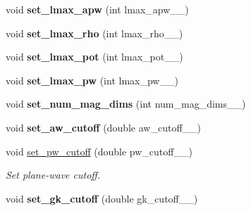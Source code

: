\begin{DoxyCompactItemize}
\item 
\hypertarget{classsirius_1_1_simulation__parameters_a7b558cb276a9d7a548591074cbcd6f9e}{}void {\bfseries set\+\_\+lmax\+\_\+apw} (int lmax\+\_\+apw\+\_\+\+\_\+)\label{classsirius_1_1_simulation__parameters_a7b558cb276a9d7a548591074cbcd6f9e}

\item 
\hypertarget{classsirius_1_1_simulation__parameters_ab98a7c7999850d742ddc232eb7f68f0a}{}void {\bfseries set\+\_\+lmax\+\_\+rho} (int lmax\+\_\+rho\+\_\+\+\_\+)\label{classsirius_1_1_simulation__parameters_ab98a7c7999850d742ddc232eb7f68f0a}

\item 
\hypertarget{classsirius_1_1_simulation__parameters_a60e8583373da5dbcac50e55300fe0f39}{}void {\bfseries set\+\_\+lmax\+\_\+pot} (int lmax\+\_\+pot\+\_\+\+\_\+)\label{classsirius_1_1_simulation__parameters_a60e8583373da5dbcac50e55300fe0f39}

\item 
\hypertarget{classsirius_1_1_simulation__parameters_a80019c7d21db2d8e6ba5a78fa75c4efd}{}void {\bfseries set\+\_\+lmax\+\_\+pw} (int lmax\+\_\+pw\+\_\+\+\_\+)\label{classsirius_1_1_simulation__parameters_a80019c7d21db2d8e6ba5a78fa75c4efd}

\item 
\hypertarget{classsirius_1_1_simulation__parameters_a6e6591b45662909c68aa5552bc393de2}{}void {\bfseries set\+\_\+num\+\_\+mag\+\_\+dims} (int num\+\_\+mag\+\_\+dims\+\_\+\+\_\+)\label{classsirius_1_1_simulation__parameters_a6e6591b45662909c68aa5552bc393de2}

\item 
\hypertarget{classsirius_1_1_simulation__parameters_a5d7ea47ce2316c17936717ba9c3a441f}{}void {\bfseries set\+\_\+aw\+\_\+cutoff} (double aw\+\_\+cutoff\+\_\+\+\_\+)\label{classsirius_1_1_simulation__parameters_a5d7ea47ce2316c17936717ba9c3a441f}

\item 
void \hyperlink{classsirius_1_1_simulation__parameters_a8bcde6b2844e19bd6537792737d76bd3}{set\+\_\+pw\+\_\+cutoff} (double pw\+\_\+cutoff\+\_\+\+\_\+)
\begin{DoxyCompactList}\small\item\em Set plane-\/wave cutoff. \end{DoxyCompactList}\item 
\hypertarget{classsirius_1_1_simulation__parameters_a4249e8a37ba37fc0dd6f847fb3053785}{}void {\bfseries set\+\_\+gk\+\_\+cutoff} (double gk\+\_\+cutoff\+\_\+\+\_\+)\label{classsirius_1_1_simulation__parameters_a4249e8a37ba37fc0dd6f847fb3053785}


\end{DoxyCompactItemize}
